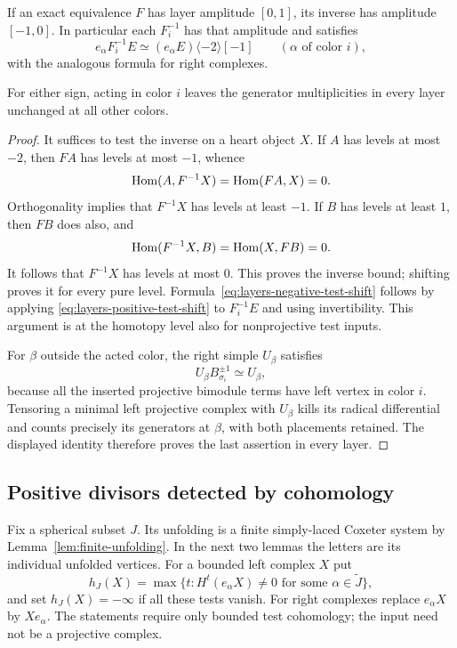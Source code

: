 \begin{lemma}\label{lem:layers-inverse-amplitude}
If an exact equivalence $F$ has layer amplitude $[0,1]$, its inverse
has amplitude $[-1,0]$.  In particular each $F_i^{-1}$ has that
amplitude and satisfies
\begin{equation}
 e_\alpha F_i^{-1}E\simeq
       (e_\alpha E)\langle-2\rangle[-1]
 \qquad(\alpha\text{ of color }i),
 \label{eq:layers-negative-test-shift}
\end{equation}
with the analogous formula for right complexes.

For either sign, acting in color $i$ leaves the generator
multiplicities in every layer unchanged at all other colors.
\end{lemma}

\begin{proof}
It suffices to test the inverse on a heart object $X$.  If $A$ has
levels at most $-2$, then $FA$ has levels at most $-1$, whence
\[
 \operatorname{Hom}(A,F^{-1}X)=\operatorname{Hom}(FA,X)=0.
\]
Orthogonality implies that $F^{-1}X$ has levels at least $-1$.
If $B$ has levels at least $1$, then $FB$ does also, and
\[
 \operatorname{Hom}(F^{-1}X,B)=\operatorname{Hom}(X,FB)=0.
\]
It follows that $F^{-1}X$ has levels at most $0$.  This proves the
inverse bound; shifting proves it for every pure level.
Formula~\eqref{eq:layers-negative-test-shift} follows by applying
\eqref{eq:layers-positive-test-shift} to $F_i^{-1}E$ and using
invertibility.  This argument is at the homotopy level also for
nonprojective test inputs.

For $\beta$ outside the acted color, the right simple $U_\beta$
satisfies
\[
 U_\beta B_{\sigma_i}^{\pm1}\simeq U_\beta,
\]
because all the inserted projective bimodule terms have left
vertex in color $i$.  Tensoring a minimal left projective complex
with $U_\beta$ kills its radical differential and counts precisely
its generators at $\beta$, with both placements retained.  The
displayed identity therefore proves the last assertion in every
layer.
\end{proof}

\subsection{Positive divisors detected by cohomology}

Fix a spherical subset $J$.  Its unfolding is a finite simply-laced
Coxeter system by Lemma~\ref{lem:finite-unfolding}.  In the next two
lemmas the letters are its individual unfolded vertices.  For a
bounded left complex $X$ put
\begin{equation}
 h_J(X)=\max\{t:H^t(e_\alpha X)\ne0
                        \text{ for some }\alpha\in\widetilde J\},
 \label{eq:layers-test-height}
\end{equation}
and set $h_J(X)=-\infty$ if all these tests vanish.  For right
complexes replace $e_\alpha X$ by $Xe_\alpha$.  The statements
require only bounded test cohomology; the input need not be a
projective complex.

